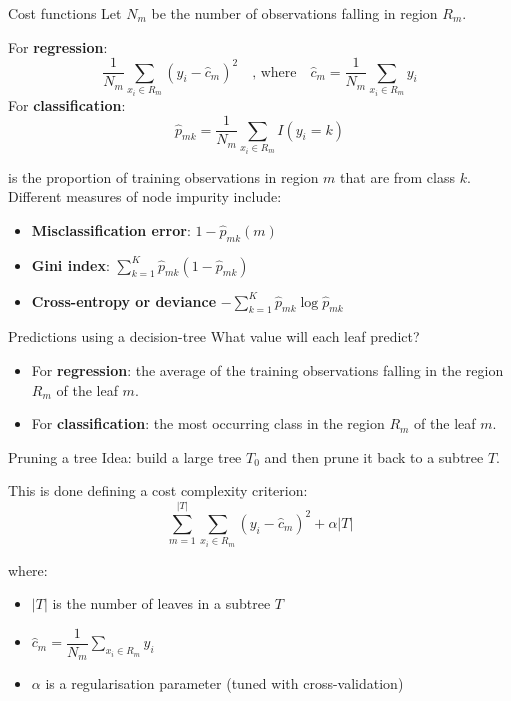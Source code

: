 \documentclass[notes]{beamer}          %
\begin{document}
\begin{frame}{Cost functions}
Let $N_m$ be the number of observations falling in region $R_m$.

For \textbf{regression}:
$$\dfrac{1}{N_m}\sum_{x_i\in R_m}(y_i-\hat c_m)^2  \quad \mbox{, where} \quad \hat c_m = \dfrac{1}{N_m}\sum_{x_i\in R_m}y_i$$
For \textbf{classification}:
\begin{equation*}
	\hat{p}_{mk}=\dfrac{1}{N_m}\sum_{x_i\in R_m}I(y_i=k)
\end{equation*}

is the proportion of training observations in region $m$ that are from class $k$. Different measures of node impurity include:
\begin{itemize}
\item  \textbf{Misclassification error}: $1-\hat{p}_{mk}(m)$
\item  \textbf{Gini index}: $\sum_{k=1}^K\hat{p}_{mk}(1-\hat{p}_{mk})$
\item  \textbf{Cross-entropy or deviance} $-\sum_{k=1}^K\hat{p}_{mk}\log\hat{p}_{mk}$
\end{itemize}
\end{frame}


\begin{frame}{Predictions using a decision-tree}
What value will each leaf predict?
\begin{itemize}
	\item For \textbf{regression}: the average of the  training observations falling in the region $R_m$ of the leaf $m$.
		\item For \textbf{classification}: the most occurring class in the region $R_m$ of the leaf $m$.
\end{itemize}

\vspace{0.5cm}

\end{frame}



\begin{frame}{Pruning a tree}
Idea: build a large tree $T_0$ and then prune it back to a subtree $T$.

This is done defining a cost complexity criterion:
$$\sum_{m=1}^{|T|}\sum_{x_i\in R_m}(y_i-\hat c_m)^2+\alpha|T|$$

where:
\begin{itemize}
\item $|T|$ is the number of leaves in a subtree $T$
\item $ \hat c_m = \dfrac{1}{N_m}\sum_{x_i\in R_m}y_i$
\item $\alpha$ is a regularisation parameter (tuned with cross-validation)
\end{itemize}
\end{frame}
\end{document}
